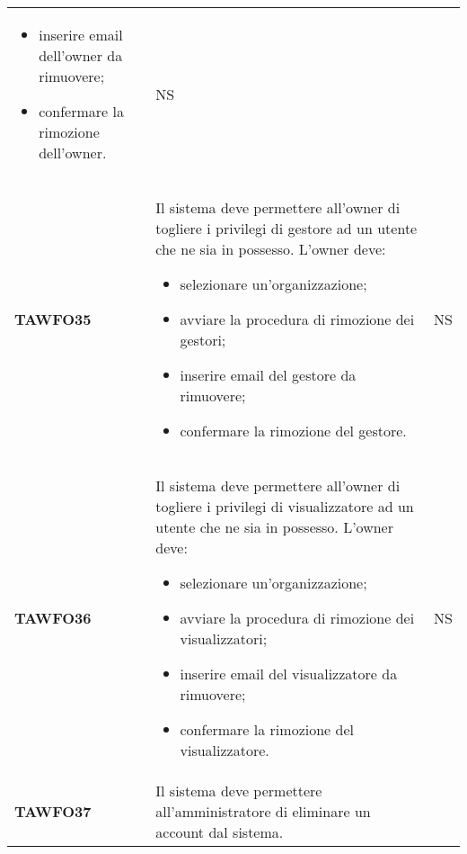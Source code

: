 \documentclass[../piano-di-qualifica.tex]{subfiles}
\begin{document}
\begin{longtable}[H]{>{\centering\bfseries}m{3cm} >{}m{11cm} >{\centering\arraybackslash}m{2cm}}
\begin{itemize}
    \item inserire email dell'owner da rimuovere;
    \item confermare la rimozione dell'owner.
  \end{itemize}
                                  & NS                                                                                                                                                                                                                                   \\
  TAWFO35                         & Il sistema deve permettere all’owner di togliere i privilegi di gestore ad un utente che ne sia in possesso. \newline
  L'owner deve:
  \begin{itemize}
    \item selezionare un'organizzazione;
    \item avviare la procedura di rimozione dei gestori;
    \item inserire email del gestore da rimuovere;
    \item confermare la rimozione del gestore.
  \end{itemize}
                                  & NS                                                                                                                                                                                                                                   \\
  TAWFO36                         & Il sistema deve permettere all’owner di togliere i privilegi di visualizzatore ad un utente che ne sia in possesso. \newline
  L'owner deve:
  \begin{itemize}
    \item selezionare un'organizzazione;
    \item avviare la procedura di rimozione dei visualizzatori;
    \item inserire email del visualizzatore da rimuovere;
    \item confermare la rimozione del visualizzatore.
  \end{itemize}
                                  & NS                                                                                                                                                                                                                                   \\
  TAWFO37                         & Il sistema deve permettere all’amministratore di eliminare un account dal sistema. \newline

\end{longtable}
\end{document}
